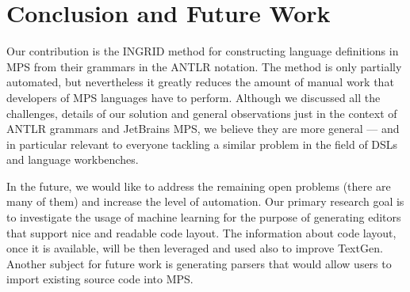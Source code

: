 \section{Conclusion and Future Work}

Our contribution is the INGRID method for constructing language definitions in MPS from their grammars in the ANTLR notation.
The method is only partially automated, but nevertheless it greatly reduces the amount of manual work that developers of MPS languages have to perform.
Although we discussed all the challenges, details of our solution and general observations just in the context of ANTLR grammars and JetBrains MPS, we believe they are more general --- and in particular relevant to everyone tackling a similar problem in the field of DSLs and language workbenches.

In the future, we would like to address the remaining open problems (there are many of them) and increase the level of automation.
Our primary research goal is to investigate the usage of machine learning for the purpose of generating editors that support nice and readable code layout.
The information about code layout, once it is available, will be then leveraged and used also to improve TextGen.
Another subject for future work is generating parsers that would allow users to import existing source code into MPS.

